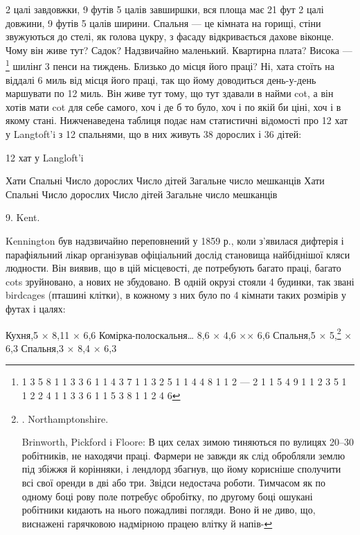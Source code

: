 \parcont{}  %
2 цалі завдовжки, 9 футів 5 цалів завширшки, вся площа має
21 фут 2 цалі довжини, 9 футів 5 цалів ширини. Спальня — це
кімната на горищі, стіни звужуються до стелі, як голова цукру,
з фасаду відкривається дахове віконце. Чому він живе тут?
Садок? Надзвичайно маленький. Квартирна плата? Висока —\footnote{
1    3    5    8    1    1    3    3    6
1    1    4    3    7    1    1    3    2    5
1    1    4    4    8    1    1    2    —   2
1    1    5    4    9    1    1    2    3    5
1    1    2    2    4    1    1    3    3    6
1    1    5    3    8    1    1    2    4    6
} шилінґ 3 пенси на тиждень. Близько до місця його праці?
Ні, хата стоїть на віддалі 6 миль від місця його праці, так що
йому доводиться день-у-день маршувати по 12 миль. Він живе
тут тому, що тут здавали в найми cot, а він хотів мати cot для
себе самого, хоч і де б то було, хоч і по якій би ціні, хоч і в якому
стані. Нижченаведена таблиця подає нам статистичні відомості
про 12 хат у Langtoft’i з 12 спальнями, що в них живуть 38 дорослих
і 36 дітей:

12 хат у Langloft’i

Хати   Спальні  Число дорослих    Число дітей    Загальне число мешканців    Хати    Спальні
Число дорослих    Число дітей    Загальне число мешканців

9. Kent.

Kennington був надзвичайно переповнений у 1859 р., коли
з’явилася дифтерія і парафіяльний лікар організував офіціальний
дослід становища найбіднішої кляси людности. Він виявив, що
в цій місцевості, де потребують багато праці, багато cots зруйновано,
а нових не збудовано. В одній окрузі стояли 4 будинки,
так звані birdcages (пташині клітки), в кожному з них було по
4 кімнати таких розмірів у футах і цалях:

Кухня,5 × 8,11 × 6,6
Комірка-полоскальня\dots{}      8,6 × 4,6 ×× 6,6
Спальня,5 × 5,\footnote{
. Northamptonshire.

Brinworth, Pickford i Floore: В цих селах зимою тиняються
по вулицях 20--30 робітників, не находячи праці. Фармери не
завжди як слід обробляли землю під збіжжя й корінняки, і лендлорд
збагнув, що йому корисніше сполучити всі свої оренди
в дві або три. Звідси недостача роботи. Тимчасом як по одному
боці рову поле потребує обробітку, по другому боці ошукані
робітники кидають на нього пожадливі погляди. Воно й не диво,
що, виснажені гарячковою надмірною працею влітку й напів-
} × 6,3
Спальня,3 × 8,4 × 6,3
\parbreak{}  %
